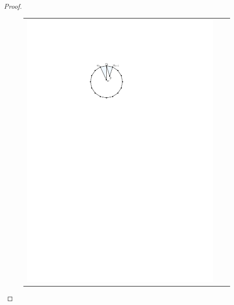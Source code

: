 \documentclass[12pt]{article}
\theoremstyle{definition}
\begin{document}
\begin{proof}
\begin{figure}
\begin{tabular}{ccc}
      \includegraphics[page=2]{figs/really_good} &

\end{tabular}
\end{figure}
\end{proof}
\end{document}
